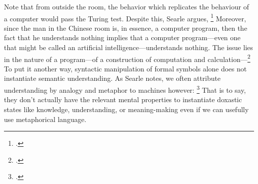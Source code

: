 \documentclass[letterpaper,notitlepage,12pt]{article}
\begin{document}
Note that from outside the room, the behavior which replicates the behaviour of
a computer would pass the Turing test.
Despite this, Searle argues, \footcite[p.
418]{searle_minds_1980}
Moreover, since the man in the Chinese room is, in essence, a computer program,
then the fact that he understands nothing implies that a computer program---even
one that might be called an artificial intelligence---understands nothing.
The issue lies in the nature of a program---of a construction of computation and
calculation---\footcite[p. 419]{searle_minds_1980}
To put it another way, syntactic manipulation of formal symbols alone does not
instantiate semantic understanding.
As Searle notes, we often attribute understanding by analogy and metaphor to
machines however: \footcite[p. 419]{searle_minds_1980}
That is to say, they don't actually have the relevant mental properties to
instantiate doxastic states like knowledge, understanding, or meaning-making
even if we can usefully use metaphorical language.
\end{document}
